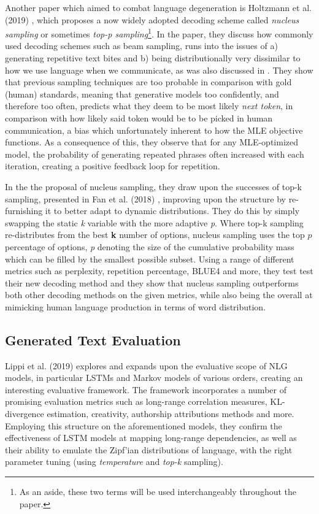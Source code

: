 Another paper which aimed to combat language degeneration is Holtzmann et al. (2019) \cite{HoltzmanAri2019TCCo}, which proposes a now widely adopted decoding scheme called \textit{nucleus sampling} or sometimes \textit{top-p sampling}\footnote{ As an aside, these two terms will be used interchangeably throughout the paper.}. In the paper, they discuss how commonly used decoding schemes such as beam sampling, runs into the issues of a) generating repetitive text bites and b) being distributionally very dissimilar to how we use language when we communicate, as was also discussed in \cite{Welleck2019Unlikelyhood}. They show that previous sampling techniques are too probable in comparison with gold (human) standards, meaning that generative models too confidently, and therefore too often, predicts what they deem to be most likely \textit{next token}, in comparison with how likely said token would be to be picked in human communication, a bias which unfortunately inherent to how the MLE objective functions. As a consequence of this, they observe that for any MLE-optimized model, the probability of generating repeated phrases often increased with each iteration, creating a positive feedback loop for repetition.

In the the proposal of nucleus sampling, they draw upon the successes of top-k sampling, presented in Fan et al. (2018) \cite{FanAngela2018HNSG}, improving upon the structure by re-furnishing it to better adapt to dynamic distributions. They do this by simply swapping the static \textit{k} variable with the more adaptive \textit{p}. Where top-k sampling re-distributes from the best \textbf{k} number of options, nucleus sampling uses the top $p$ percentage of options, \textit{p} denoting the size of the cumulative probability mass which can be filled by the smallest possible subset. Using a range of different metrics such as perplexity, repetition percentage, BLUE4 and more, they test test their new decoding method and they show that nucleus sampling outperforms both other decoding methods on the given metrics, while also being the overall at mimicking human language production in terms of word distribution.

\subsection{Generated Text Evaluation}
\label{sec:eval-of-generated-text}
Lippi et al. (2019) \cite{LippiMarco2019NLSF} explores and expands upon the evaluative scope of NLG models, in particular LSTMs and Markov models of various orders, creating an interesting evaluative framework. The framework incorporates a number of promising evaluation metrics such as long-range correlation measures, KL-divergence estimation, creativity, authorship attributions methods and more. Employing this structure on the aforementioned models, they confirm the effectiveness of LSTM models at mapping long-range dependencies, as well as their ability to emulate the Zipf’ian distributions of language, with the right parameter tuning (using \textit{temperature} and \textit{top-k} sampling).

